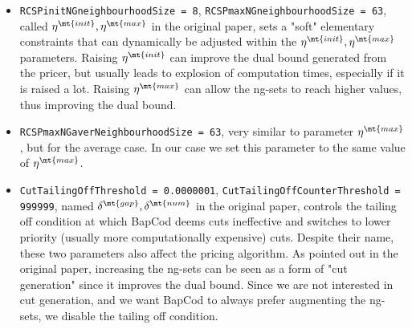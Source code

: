 \begin{itemize}
\begin{itemize}
		      \item \texttt{RCSPinitNGneighbourhoodSize = 8}, \texttt{RCSPmaxNGneighbourhoodSize = 63}, called $\eta^\mt{init}, \eta^\mt{max}$ in the original paper, sets a "soft" elementary constraints that can dynamically be adjusted within the $\eta^\mt{init}, \eta^\mt{max}$ parameters.
		            Raising $\eta^\mt{init}$ can improve the dual bound generated from the pricer, but usually leads to explosion of computation times, especially if it is raised a lot.
		            Raising $\eta^\mt{max}$ can allow the ng-sets to reach higher values, thus improving the dual bound.
		      \item \texttt{RCSPmaxNGaverNeighbourhoodSize = 63}, very similar to parameter $\eta^\mt{max}$, but for the average case.
		            In our case we set this parameter to the same value of $\eta^\mt{max}$.
		      \item \texttt{CutTailingOffThreshold = 0.0000001}, \texttt{CutTailingOffCounterThreshold = 999999}, named $\delta^\mt{gap}, \delta^\mt{num}$ in the original paper, controls the tailing off condition at which BapCod deems cuts ineffective and switches to lower priority (usually more computationally expensive) cuts.
		            Despite their name, these two parameters also affect the pricing algorithm.
		            As pointed out in the original paper, increasing the ng-sets can be seen as a form of "cut generation" since it improves the dual bound.
		            Since we are not interested in cut generation, and we want BapCod to always prefer augmenting the ng-sets, we disable the tailing off condition.
	      \end{itemize}
\end{itemize}
